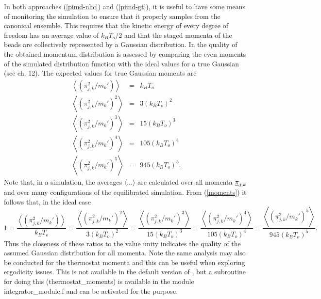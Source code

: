 In both approaches (\ref{pimd-nhc}) and (\ref{pimd-gt}), it is useful
to have some means of monitoring the simulation to ensure that it
properly samples from the canonical ensemble. This requires that the
kinetic energy of every degree of freedom has an average value of
$k_{B}T_{o}/2$ and that the staged momenta of the beads are
collectively represented by a Gaussian distribution. In \DD{} the
quality of the obtained momentum distribution is assessed by comparing
the even moments of the simulated distribution function with the ideal
values for a true Gaussian (see \cite{smith-14} ch. 12).  The expected
values for true Gaussian moments are
\begin{eqnarray}
  \left \langle (\pi_{j,k}^{2}/m_{k}') \right \rangle &=& k_{B}T_{o} \nonumber \\
  \left \langle (\pi_{j,k}^{2}/m_{k}')^{2} \right \rangle &=& 3 (k_{B}T_{o})^{2} \nonumber \\
  \left \langle (\pi_{j,k}^{2}/m_{k}')^{3} \right \rangle &=& 15(k_{B}T_{o})^{3}  \label{moments}\\
  \left \langle (\pi_{j,k}^{2}/m_{k}')^{4} \right \rangle &=& 105(k_{B}T_{o})^{4} \nonumber \\
  \left \langle (\pi_{j,k}^{2}/m_{k}')^{5} \right \rangle &=& 945(k_{B}T_{o})^{5}. \nonumber
\end{eqnarray}
Note that, in a simulation, the averages $\langle \ldots \rangle$ are
calculated over all momenta $\mbox{$\underline{\pi}$}_{j,k}$ and over many
configurations of the equilibrated simulation.  From (\ref{moments})
it follows that, in the ideal case
\begin{equation}
  1=\frac{\left \langle (\pi_{j,k}^{2}/m_{k}') \right \rangle }{k_{B}T_{o}}=
  \frac{\left \langle (\pi_{j,k}^{2}/m_{k}')^{2} \right \rangle }{3 (k_{B}T_{o})^{2}}=
  \frac{\left \langle (\pi_{j,k}^{2}/m_{k}')^{3} \right \rangle }{15 (k_{B}T_{o})^{3}}=
  \frac{\left \langle (\pi_{j,k}^{2}/m_{k}')^{4} \right \rangle }{105 (k_{B}T_{o})^{4}}=
  \frac{\left \langle (\pi_{j,k}^{2}/m_{k}')^{5} \right \rangle }{945 (k_{B}T_{o})^{5}}.
  \label{nmom}
\end{equation}
Thus the closeness of these ratios to the value unity indicates the
quality of the assumed Gaussian distribution for all momenta.  Note
the same analysis may also be conducted for the thermostat momenta and
this can be useful when exploring ergodicity issues. This is not
available in the default version of \D{}, but a subroutine for doing
this ({\sc thermostat\_moments}) is available in the module {\sc
  integrator\_module.f} and can be activated for the purpose.

